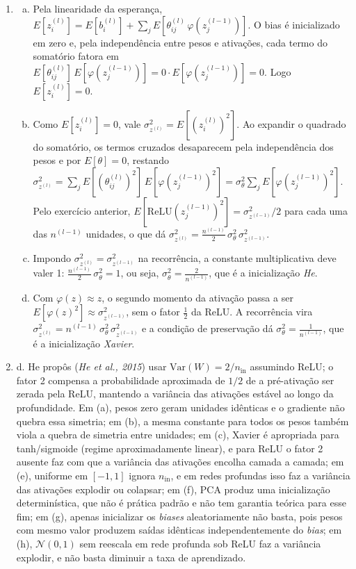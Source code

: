 \documentclass{dlproblemset}
\begin{document}
\begin{enumerate}[1)]
    \item
    \begin{enumerate}[a)]
        \item Pela linearidade da esperança, $E[z^{(l)}_i]=E[b^{(l)}_i]+\sum_j E[\theta^{(l)}_{ij}\,\varphi(z^{(l-1)}_j)]$. O bias é inicializado em zero e, pela independência entre pesos e ativações, cada termo do somatório fatora em $E[\theta^{(l)}_{ij}]\,E[\varphi(z^{(l-1)}_j)]=0\cdot E[\varphi(z^{(l-1)}_j)]=0$. Logo $E[z^{(l)}_i]=0$.
        \item Como $E[z^{(l)}_i]=0$, vale $\sigma^2_{z^{(l)}}=E[(z^{(l)}_i)^2]$. Ao expandir o quadrado do somatório, os termos cruzados desaparecem pela independência dos pesos e por $E[\theta]=0$, restando $\sigma^2_{z^{(l)}}=\sum_j E[(\theta^{(l)}_{ij})^2]\,E[\varphi(z^{(l-1)}_j)^2]=\sigma_\theta^2\sum_j E[\varphi(z^{(l-1)}_j)^2]$. Pelo exercício anterior, $E[\mathrm{ReLU}(z^{(l-1)}_j)^2]=\sigma^2_{z^{(l-1)}}/2$ para cada uma das $n^{(l-1)}$ unidades, o que dá $\sigma^2_{z^{(l)}} = \frac{n^{(l-1)}}{2}\,\sigma_\theta^2\,\sigma^2_{z^{(l-1)}}$.
        \item Impondo $\sigma^2_{z^{(l)}}=\sigma^2_{z^{(l-1)}}$ na recorrência, a constante multiplicativa deve valer 1: $\frac{n^{(l-1)}}{2}\,\sigma_\theta^2=1$, ou seja, $\sigma_\theta^2=\frac{2}{n^{(l-1)}}$, que é a inicialização \textit{He}.
        \item Com $\varphi(z)\approx z$, o segundo momento da ativação passa a ser $E[\varphi(z)^2]\approx\sigma^2_{z^{(l-1)}}$, sem o fator $\frac{1}{2}$ da ReLU. A recorrência vira $\sigma^2_{z^{(l)}}=n^{(l-1)}\,\sigma_\theta^2\,\sigma^2_{z^{(l-1)}}$ e a condição de preservação dá $\sigma_\theta^2=\frac{1}{n^{(l-1)}}$, que é a inicialização \textit{Xavier}.
    \end{enumerate}

    \item d. He propôs (\textit{He et al., 2015}) usar $\mathrm{Var}(W) = 2/n_{\text{in}}$ assumindo ReLU; o fator 2 compensa a probabilidade aproximada de $1/2$ de a pré-ativação ser zerada pela ReLU, mantendo a variância das ativações estável ao longo da profundidade. Em (a), pesos zero geram unidades idênticas e o gradiente não quebra essa simetria; em (b), a mesma constante para todos os pesos também viola a quebra de simetria entre unidades; em (c), Xavier é apropriada para tanh/sigmoide (regime aproximadamente linear), e para ReLU o fator 2 ausente faz com que a variância das ativações encolha camada a camada; em (e), uniforme em $[-1, 1]$ ignora $n_{\text{in}}$, e em redes profundas isso faz a variância das ativações explodir ou colapsar; em (f), PCA produz uma inicialização determinística, que não é prática padrão e não tem garantia teórica para esse fim; em (g), apenas inicializar os \textit{biases} aleatoriamente não basta, pois pesos com mesmo valor produzem saídas idênticas independentemente do \textit{bias}; em (h), $\mathcal{N}(0, 1)$ sem reescala em rede profunda sob ReLU faz a variância explodir, e não basta diminuir a taxa de aprendizado.


\end{enumerate}
\end{document}
